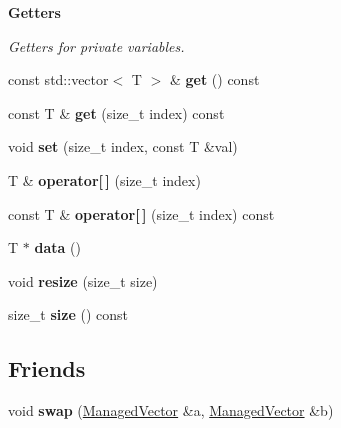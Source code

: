 \begin{Indent}\textbf{ Getters}\par
{\em Getters for private variables. }\begin{DoxyCompactItemize}
\item 
\mbox{\label{classblaze_1_1util_1_1ManagedVector_a022ccbf1fea9dcdb117c5204040f2309}} 
const std\+::vector$<$ T $>$ \& {\bfseries get} () const
\item 
\mbox{\label{classblaze_1_1util_1_1ManagedVector_ab1694bb9a81e5ada13f52a9a15471e86}} 
const T \& {\bfseries get} (size\+\_\+t index) const
\item 
\mbox{\label{classblaze_1_1util_1_1ManagedVector_a8d965d5a267ec16597c125d5fd24cdf5}} 
void {\bfseries set} (size\+\_\+t index, const T \&val)
\item 
\mbox{\label{classblaze_1_1util_1_1ManagedVector_a543ca5dd79a1f857c74395667107b90f}} 
T \& {\bfseries operator\mbox{[}$\,$\mbox{]}} (size\+\_\+t index)
\item 
\mbox{\label{classblaze_1_1util_1_1ManagedVector_a57f0339cded2619686f687ad91b02ddd}} 
const T \& {\bfseries operator\mbox{[}$\,$\mbox{]}} (size\+\_\+t index) const
\item 
\mbox{\label{classblaze_1_1util_1_1ManagedVector_aec70a1885f51489f14d3421e2a72bd97}} 
T $\ast$ {\bfseries data} ()
\item 
\mbox{\label{classblaze_1_1util_1_1ManagedVector_ad9d86db576904d545d03b35bb4fa5a7f}} 
void {\bfseries resize} (size\+\_\+t size)
\item 
\mbox{\label{classblaze_1_1util_1_1ManagedVector_a1bd4ea82bc12edc4d84384259abeafc8}} 
size\+\_\+t {\bfseries size} () const
\end{DoxyCompactItemize}
\end{Indent}
\subsection*{Friends}
\begin{DoxyCompactItemize}
\item 
\mbox{\label{classblaze_1_1util_1_1ManagedVector_a2356c6e19e1abf8baa8245af129607b8}} 
void {\bfseries swap} (\hyperlink{classblaze_1_1util_1_1ManagedVector}{Managed\+Vector} \&a, \hyperlink{classblaze_1_1util_1_1ManagedVector}{Managed\+Vector} \&b)
\end{DoxyCompactItemize}



